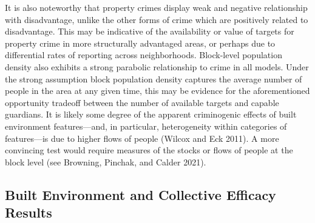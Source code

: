 \documentclass [11pt, proquest] {uwthesis}[2015/03/03]
\begin{document}
\begin{longtable}[c]{|p{0.10in}|p{0.80in}|p{0.75in}|p{0.75in}|p{0.75in}|p{0.75in}|p{0.75in}}
Roman}\textbf{(}}}\fontsize{10}{10}\selectfont{\textcolor[HTML]{000000}{\global\setmainfont{Latin Modern Roman}\textbf{0.03}}}\fontsize{10}{10}\selectfont{\textcolor[HTML]{000000}{\global\setmainfont{Latin Modern Roman}\textbf{)}}}} & \multicolumn{1}{!{\color[HTML]{000000}\vrule width 0pt}>{\centering}p{\dimexpr 0.75in+0\tabcolsep+0\arrayrulewidth}!{\color[HTML]{000000}\vrule width 0pt}}{\fontsize{10}{10}\selectfont{\textcolor[HTML]{000000}{\global\setmainfont{Latin Modern Roman}\textbf{-0.05}}}\fontsize{10}{10}\selectfont{\textcolor[HTML]{000000}{\global\setmainfont{Latin Modern Roman}\textbf{\linebreak }}}\fontsize{10}{10}\selectfont{\textcolor[HTML]{000000}{\global\setmainfont{Latin Modern Roman}\textbf{(}}}\fontsize{10}{10}\selectfont{\textcolor[HTML]{000000}{\global\setmainfont{Latin Modern Roman}\textbf{0.02}}}\fontsize{10}{10}\selectfont{\textcolor[HTML]{000000}{\global\setmainfont{Latin Modern Roman}\textbf{)}}}} \\

\noalign{\global\setlength{\arrayrulewidth}{0.5pt}}\arrayrulecolor[HTML]{000000}\cline{1-7}

\end{longtable}
It is also noteworthy that property crimes display weak and negative relationship with disadvantage, unlike the other forms of crime which are positively related to disadvantage. This may be indicative of the availability or value of targets for property crime in more structurally advantaged areas, or perhaps due to differential rates of reporting across neighborhoods. Block-level population density also exhibits a strong parabolic relationship to crime in all models. Under the strong assumption block population density captures the average number of people in the area at any given time, this may be evidence for the aforementioned opportunity tradeoff between the number of available targets and capable guardians. It is likely some degree of the apparent criminogenic effects of built environment features---and, in particular, heterogeneity within categories of features---is due to higher flows of people (Wilcox and Eck 2011). A more convincing test would require measures of the stocks or flows of people at the block level (see Browning, Pinchak, and Calder 2021).

\hypertarget{built-environment-and-collective-efficacy-results}{%
\subsection{Built Environment and Collective Efficacy Results}\label{built-environment-and-collective-efficacy-results}}
\end{document}
